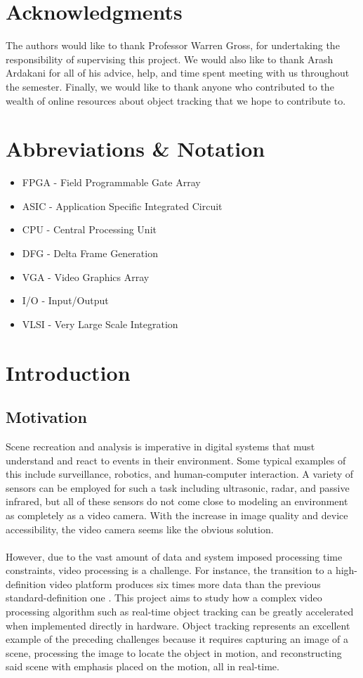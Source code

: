 \documentclass[12pt]{article} %
\begin{document}
\section*{Acknowledgments}
The authors would like to thank Professor Warren Gross, for undertaking the responsibility of supervising this project. We would also like to thank Arash Ardakani for all of his advice, help, and time spent meeting with us throughout the semester. Finally, we would like to thank anyone who contributed to the wealth of online resources about object tracking that we hope to contribute to.
\pagebreak
\tableofcontents
\pagebreak
\section{Abbreviations \& Notation}
\begin{itemize}
\item[] FPGA - Field Programmable Gate Array
\item[] ASIC - Application Specific Integrated Circuit
\item[] CPU - Central Processing Unit
\item[] DFG - Delta Frame Generation
\item[] VGA - Video Graphics Array
\item[] I/O - Input/Output
\item[] VLSI - Very Large Scale Integration
\end{itemize}
\section{Introduction}
\subsection{Motivation}
Scene recreation and analysis is imperative in digital systems that must understand and react to events in their environment. Some typical examples of this include surveillance, robotics, and human-computer interaction. A variety of sensors can be employed for such a task including ultrasonic, radar, and passive infrared, but all of these sensors do not come close to modeling an environment as completely as a video camera. With the increase in image quality and device accessibility, the video camera seems like the obvious solution. \\\\
However, due to the vast amount of data and system imposed processing time constraints, video processing is a challenge. For instance, the transition to a high-definition video platform produces six times more data than the previous standard-definition one \cite{3}. This project aims to study how a complex video processing algorithm such as real-time object tracking can be greatly accelerated when implemented directly in hardware. Object tracking represents an excellent example of the preceding challenges because it requires capturing an image of a scene, processing the image to locate the object in motion, and reconstructing said scene with emphasis placed on the motion, all in real-time.
\end{document}
